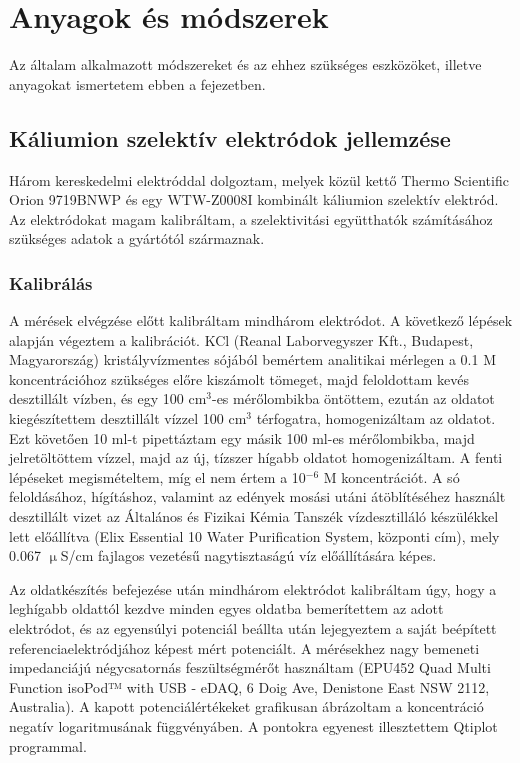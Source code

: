 \chapter{Anyagok és módszerek}
\pagestyle{headings}

Az általam alkalmazott módszereket és az ehhez szükséges eszközöket, illetve anyagokat ismertetem ebben a fejezetben.

\section{Káliumion szelektív elektródok jellemzése}

Három kereskedelmi elektróddal dolgoztam, melyek közül kettő Thermo Scientific Orion 9719BNWP és egy WTW-Z0008I kombinált káliumion szelektív elektród. Az elektródokat magam kalibráltam, a szelektivitási együtthatók számításához szükséges adatok a gyártótól származnak.

\subsection{Kalibrálás}
A mérések elvégzése előtt kalibráltam mindhárom elektródot. A következő lépések alapján végeztem a kalibrációt. KCl (Reanal Laborvegyszer Kft., Budapest, Magyarország) kristályvízmentes sójából bemértem analitikai mérlegen a 0.1 M koncentrációhoz szükséges előre kiszámolt tömeget, majd feloldottam kevés desztillált vízben, és egy 100 cm$^3$-es mérőlombikba öntöttem, ezután az oldatot kiegészítettem desztillált vízzel 100 cm$^3$ térfogatra, homogenizáltam az oldatot. Ezt követően 10 ml-t pipettáztam egy másik 100 ml-es mérőlombikba, majd jelretöltöttem vízzel, majd az új, tízszer hígabb oldatot homogenizáltam. A fenti lépéseket megismételtem, míg el nem értem a 10$^{-6}$ M koncentrációt. A só feloldásához, hígításhoz, valamint az edények mosási utáni átöblítéséhez használt desztillált vizet az Általános és Fizikai Kémia Tanszék vízdesztilláló készülékkel lett előállítva (Elix Essential 10 Water Purification System, központi cím), mely 0.067 $\upmu$S/cm fajlagos vezetésű nagytisztaságú víz előállítására képes. 

Az oldatkészítés befejezése után mindhárom elektródot kalibráltam úgy, hogy a leghígabb oldattól kezdve minden egyes oldatba bemerítettem az adott elektródot, és az egyensúlyi potenciál beállta után lejegyeztem a saját beépített referenciaelektródjához képest mért potenciált. A mérésekhez nagy bemeneti impedanciájú négycsatornás feszültségmérőt használtam (EPU452 Quad Multi Function isoPod™ with USB - eDAQ, 6 Doig Ave, Denistone East NSW 2112, Australia). A kapott potenciálértékeket grafikusan ábrázoltam a koncentráció negatív logaritmusának függvényáben. A pontokra egyenest illesztettem Qtiplot programmal.  

